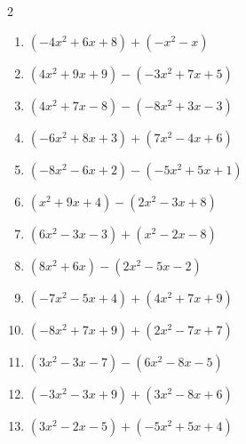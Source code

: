 \begin{multicols}{2}
\begin{enumerate}
        \phantom{$=6x$}

  \item $(-4x^{2}+6x+8)+(-x^{2}-x)$


  \item $(4x^{2}+9x+9)-(-3x^{2}+7x+5)$


  \item $(4x^{2}+7x-8)-(-8x^{2}+3x-3)$


  \item $(-6x^{2}+8x+3)+(7x^{2}-4x+6)$


  \item $(-8x^{2}-6x+2)-(-5x^{2}+5x+1)$


  \item $(x^{2}+9x+4)-(2x^{2}-3x+8)$


  \item $(6x^{2}-3x-3)+(x^{2}-2x-8)$


\columnbreak %

  \item $(8x^{2}+6x)-(2x^{2}-5x-2)$


  \item $(-7x^{2}-5x+4)+(4x^{2}+7x+9)$


  \item $(-8x^{2}+7x+9)+(2x^{2}-7x+7)$


  \item $(3x^{2}-3x-7)-(6x^{2}-8x-5)$


  \item $(-3x^{2}-3x+9)+(3x^{2}-8x+6)$

        \phantom{$=-11x+15$}

  \item $(3x^{2}-2x-5)+(-5x^{2}+5x+4)$



\end{enumerate}
\end{multicols}

